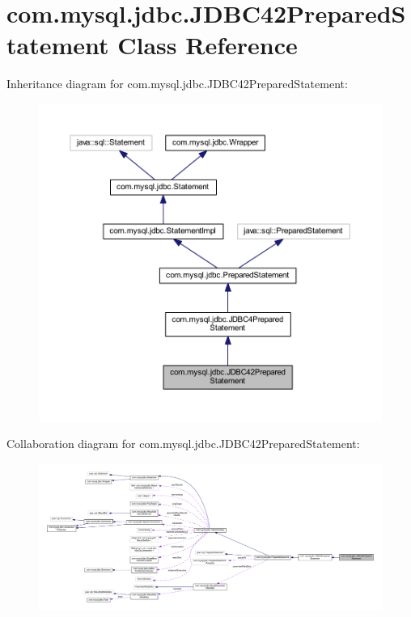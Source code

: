 \hypertarget{classcom_1_1mysql_1_1jdbc_1_1_j_d_b_c42_prepared_statement}{}\section{com.\+mysql.\+jdbc.\+J\+D\+B\+C42\+Prepared\+Statement Class Reference}
\label{classcom_1_1mysql_1_1jdbc_1_1_j_d_b_c42_prepared_statement}


Inheritance diagram for com.\+mysql.\+jdbc.\+J\+D\+B\+C42\+Prepared\+Statement\+:
\nopagebreak
\begin{figure}[H]
\begin{center}
\leavevmode
\includegraphics[width=350pt]{classcom_1_1mysql_1_1jdbc_1_1_j_d_b_c42_prepared_statement__inherit__graph}
\end{center}
\end{figure}


Collaboration diagram for com.\+mysql.\+jdbc.\+J\+D\+B\+C42\+Prepared\+Statement\+:
\nopagebreak
\begin{figure}[H]
\begin{center}
\leavevmode
\includegraphics[width=350pt]{classcom_1_1mysql_1_1jdbc_1_1_j_d_b_c42_prepared_statement__coll__graph}
\end{center}
\end{figure}
